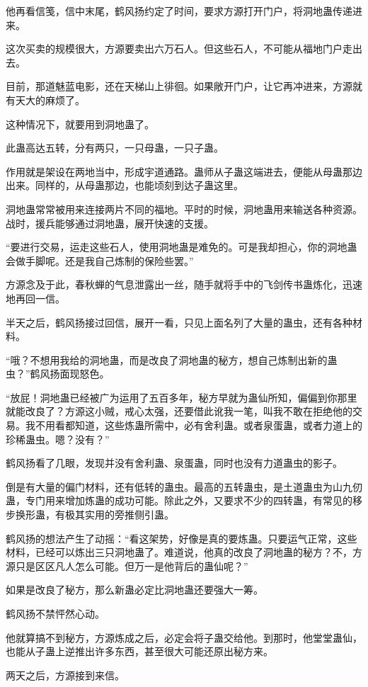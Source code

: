 \begin{this_body}
他再看信笺，信中末尾，鹤风扬约定了时间，要求方源打开门户，将洞地蛊传递进来。

这次买卖的规模很大，方源要卖出六万石人。但这些石人，不可能从福地门户走出去。

目前，那道魅蓝电影，还在天梯山上徘徊。如果敞开门户，让它再冲进来，方源就有天大的麻烦了。

这种情况下，就要用到洞地蛊了。

此蛊高达五转，分有两只，一只母蛊，一只子蛊。

作用就是架设在两地当中，形成宇道通路。蛊师从子蛊这端进去，便能从母蛊那边出来。同样的，从母蛊那边，也能顷刻到达子蛊这里。

洞地蛊常常被用来连接两片不同的福地。平时的时候，洞地蛊用来输送各种资源。战时，援兵能够通过洞地蛊，展开快速的支援。

“要进行交易，运走这些石人，使用洞地蛊是难免的。可是我却担心，你的洞地蛊会做手脚呢。还是我自己炼制的保险些罢。”

方源念及于此，春秋蝉的气息泄露出一丝，随手就将手中的飞剑传书蛊炼化，迅速地再回一信。

半天之后，鹤风扬接过回信，展开一看，只见上面名列了大量的蛊虫，还有各种材料。

“哦？不想用我给的洞地蛊，而是改良了洞地蛊的秘方，想自己炼制出新的蛊虫？”鹤风扬面现怒色。

“放屁！洞地蛊已经被广为运用了五百多年，秘方早就为蛊仙所知，偏偏到你那里就能改良了？方源这小贼，戒心太强，还要借此讹我一笔，叫我不敢在拒绝他的交易。我不用看都知道，这些炼蛊所需中，必有舍利蛊。或者泉蛋蛊，或者力道上的珍稀蛊虫。嗯？没有？”

鹤风扬看了几眼，发现并没有舍利蛊、泉蛋蛊，同时也没有力道蛊虫的影子。

倒是有大量的偏门材料，还有低转的蛊虫。最高的五转蛊虫，是土道蛊虫为山九仞蛊，专门用来增加炼蛊的成功可能。除此之外，又要求不少的四转蛊，有常见的移步换形蛊，有极其实用的旁推侧引蛊。

鹤风扬的想法产生了动摇：“看这架势，好像是真的要炼蛊。只要运气正常，这些材料，已经可以炼出三只洞地蛊了。难道说，他真的改良了洞地蛊的秘方？不，方源只是区区凡人怎么可能。但万一是他背后的蛊仙呢？”

如果是改良了秘方，那么新蛊必定比洞地蛊还要强大一筹。

鹤风扬不禁怦然心动。

他就算搞不到秘方，方源炼成之后，必定会将子蛊交给他。到那时，他堂堂蛊仙，也能从子蛊上逆推出许多东西，甚至很大可能还原出秘方来。

两天之后，方源接到来信。


\end{this_body}
